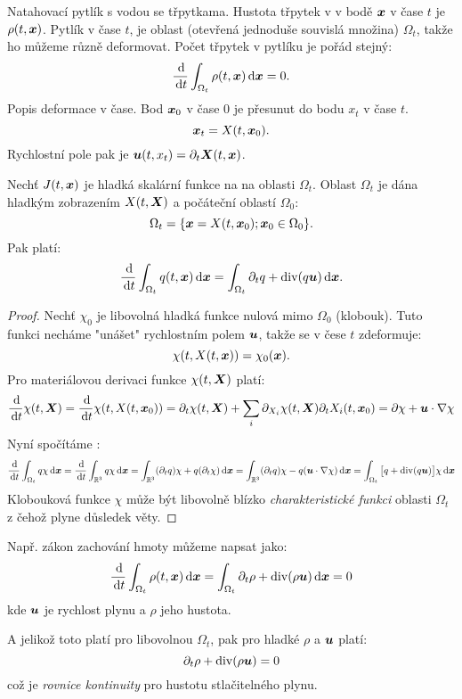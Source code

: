 Natahovací pytlík s vodou se třpytkama. Hustota třpytek v v bodě $\mathbf{\boldsymbol{x}}$ v čase $t$ je $\rho(t,\mathbf{\boldsymbol{x}})$. Pytlík v čase $t$, je
oblast (otevřená jednoduše souvislá množina) $\Omega_t$, takže ho můžeme různě deformovat. Počet třpytek v pytlíku je pořád stejný:
\[
    \frac{\,{\rm d}}{\,{\rm d} t} \int_{\Omega_t} \rho(t,\mathbf{\boldsymbol{x}}) \,{\rm d} \mathbf{\boldsymbol{x}} =0.    
\]
Popis deformace v čase. Bod $\mathbf{\boldsymbol{x}}_0$ v čase $0$ je přesunut do bodu $x_t$ v čase $t$. 
\[
  \mathbf{\boldsymbol{x}}_t = X(t, \mathbf{\boldsymbol{x}}_0).
\]
Rychlostní pole pak je $\mathbf{\boldsymbol{u}}(t, x_t)= \partial_t \mathbf{\boldsymbol{X}}(t, \mathbf{\boldsymbol{x}})$.

\begin{theorem}
Nechť $J(t, \mathbf{\boldsymbol{x}})$ je hladká skalární funkce na na oblasti $\Omega_t$. Oblast $\Omega_t$ je dána hladkým zobrazením $X(t, \mathbf{\boldsymbol{X}})$
a počáteční oblastí $\Omega_0$:
\[
    \Omega_t = \{\mathbf{\boldsymbol{x}} = X(t, \mathbf{\boldsymbol{x}}_0); \mathbf{\boldsymbol{x}}_0\in \Omega_0\}.
\]
Pak platí:
\begin{equation}
    \frac{\,{\rm d}}{\,{\rm d} t} \int_{\Omega_t} q(t,\mathbf{\boldsymbol{x}}) \,{\rm d} \mathbf{\boldsymbol{x}} = \int_{\Omega_t} \partial_t q + {\rm div}( q\mathbf{\boldsymbol{u}} ) \,{\rm d} \mathbf{\boldsymbol{x}}.
\end{equation}
\end{theorem}
\begin{proof}
Nechť $\chi_0$ je libovolná hladká funkce nulová mimo $\Omega_0$ (klobouk). Tuto funkci necháme "unášet" rychlostním polem $\mathbf{\boldsymbol{u}}$, takže se v čese $t$ zdeformuje:
\[
  \chi(t, X(t, \mathbf{\boldsymbol{x}}))=\chi_0(\mathbf{\boldsymbol{x}}).
\]
Pro materiálovou derivaci funkce $\chi(t, \mathbf{\boldsymbol{X}})$ platí:
\[
  \frac{\,{\rm d}}{\,{\rm d} t} \chi(t, \mathbf{\boldsymbol{X}}) = \frac{\,{\rm d}}{\,{\rm d} t} \chi(t, X(t, \mathbf{\boldsymbol{x}}_0))=\partial_t \chi(t, \mathbf{\boldsymbol{X}}) + \sum_i \partial_{X_i} \chi(t, \mathbf{\boldsymbol{X}}) \partial_t X_i(t, \mathbf{\boldsymbol{x}}_0)=
  \partial \chi + \mathbf{\boldsymbol{u}} \cdot \nabla \chi 
\]
Nyní spočítáme :
\[ 
    \frac{\,{\rm d}}{\,{\rm d} t} \int_{\Omega_t} q \chi \,{\rm d} \mathbf{\boldsymbol{x}} =
    \frac{\,{\rm d}}{\,{\rm d} t} \int_{{\mathbb R}^3} q \chi \,{\rm d} \mathbf{\boldsymbol{x}} =
    \int_{{\mathbb R}^3} (\partial_t q) \chi + q (\partial_t \chi) \,{\rm d} \mathbf{\boldsymbol{x}} =
    \int_{{\mathbb R}^3} (\partial_t q) \chi - q (\mathbf{\boldsymbol{u}} \cdot \nabla \chi) \,{\rm d} \mathbf{\boldsymbol{x}}=
    \int_{\Omega_t} \big[ q + {\rm div}(q \mathbf{\boldsymbol{u}})\big] \chi \,{\rm d} \mathbf{\boldsymbol{x}}
\]
Klobouková funkce $\chi$ může být libovolně blízko \emph{charakteristické funkci} oblasti $\Omega_t$ z čehož plyne důsledek věty.

\end{proof}


Např. zákon zachování hmoty můžeme napsat jako:
\[
    \frac{\,{\rm d}}{\,{\rm d} t} \int_{\Omega_t} \rho(t,\mathbf{\boldsymbol{x}}) \,{\rm d} \mathbf{\boldsymbol{x}} = \int_{\Omega_t} \partial_t \rho + {\rm div} (\rho \mathbf{\boldsymbol{u}}) \,{\rm d} \mathbf{\boldsymbol{x}} = 0
\]
kde $\mathbf{\boldsymbol{u}}$ je rychlost plynu a $\rho$ jeho hustota.

A jelikož toto platí pro libovolnou $\Omega_t$, pak pro hladké $\rho$ a $\mathbf{\boldsymbol{u}}$ platí:
\[
    \partial_t \rho + {\rm div} (\rho \mathbf{\boldsymbol{u}}) =0
\]
což je \emph{rovnice kontinuity} pro hustotu stlačitelného plynu.


